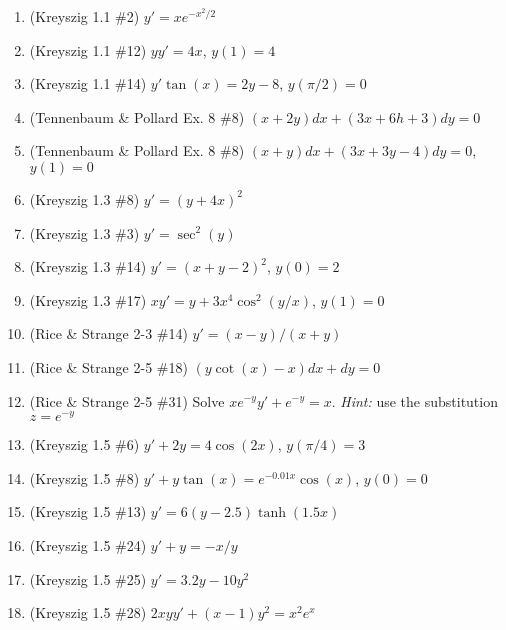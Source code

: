 \documentclass[letterpaper, fontsize=12pt]{scrartcl} %
\numberwithin{equation}{section} %
\numberwithin{figure}{section} %
\numberwithin{table}{section} %
\begin{document}
\begin{enumerate}

\item (Kreyszig 1.1 \#2) $y' = xe^{-x^2/2}$

\item (Kreyszig 1.1 \#12) $yy' = 4x$, $y(1) = 4$

\item (Kreyszig 1.1 \#14) $y' \tan(x) =  2y - 8$, $y(\pi/2) = 0$

\item (Tennenbaum \& Pollard Ex. 8 \#8) $(x + 2y)dx + (3x + 6h + 3)dy = 0$

\item (Tennenbaum \& Pollard Ex. 8 \#8) $(x + y)dx + (3x + 3y - 4)dy = 0$, $y(1) = 0$

\item (Kreyszig 1.3 \#8) $y' = (y + 4x)^2$

\item (Kreyszig 1.3 \#3) $y' = \sec^2(y)$

\item (Kreyszig 1.3 \#14) $y' = (x + y - 2)^2$, $y(0) = 2$

\item (Kreyszig 1.3 \#17) $xy' = y + 3x^4 \cos^2(y/x)$, $y(1) =0$

\item (Rice \& Strange 2-3 \#14) $y' = (x-y)/(x + y)$

\item (Rice \& Strange 2-5 \#18) $(y \cot(x) - x) dx + dy = 0$

\item (Rice \& Strange 2-5 \#31) Solve $xe^{-y}y' + e^{-y} = x$. \textit{Hint:} use the substitution $z = e^{-y}$

\item (Kreyszig 1.5 \#6) $y' + 2y = 4 \cos(2x)$, $y(\pi/4)= 3$

\item (Kreyszig 1.5 \#8) $y' + y \tan(x) = e^{-0.01x}\cos(x)$, $y(0) = 0$

\item (Kreyszig 1.5 \#13) $y' = 6(y - 2.5) \tanh(1.5x)$

\item (Kreyszig 1.5 \#24) $y'  + y = -x/y$

\item (Kreyszig 1.5 \#25) $y' = 3.2y - 10y^2$

\item (Kreyszig 1.5 \#28) $2xyy' + (x-1)y^2 = x^2e^x$


\end{enumerate}
\end{document}
